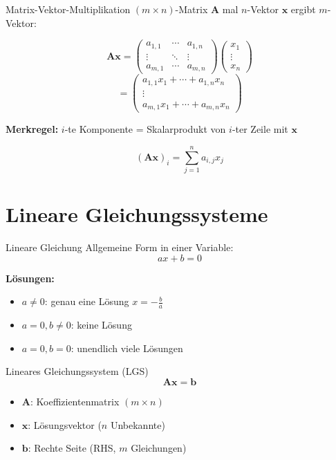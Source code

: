 \documentclass[a4paper, fontsize=7pt]{scrartcl}
\begin{document}
\begin{mainbox}{Matrix-Vektor-Multiplikation}
$(m \times n)$-Matrix $\mathbf{A}$ mal $n$-Vektor $\mathbf{x}$ ergibt $m$-Vektor:

\[\mathbf{A}\mathbf{x} = \begin{pmatrix}
a_{1,1} & \cdots & a_{1,n} \\
\vdots & \ddots & \vdots \\
a_{m,1} & \cdots & a_{m,n}
\end{pmatrix} \begin{pmatrix} x_1 \\ \vdots \\ x_n \end{pmatrix} \]
\[= \begin{pmatrix}
a_{1,1}x_1 + \cdots + a_{1,n}x_n \\
\vdots \\
a_{m,1}x_1 + \cdots + a_{m,n}x_n
\end{pmatrix}\]

\textbf{Merkregel:} $i$-te Komponente = Skalarprodukt von $i$-ter Zeile mit $\mathbf{x}$

$$(\mathbf{A}\mathbf{x})_i = \sum_{j=1}^{n} a_{i,j} x_j$$
\end{mainbox}

\section{Lineare Gleichungssysteme}

\begin{mainbox}{Lineare Gleichung}
Allgemeine Form in einer Variable:
$$ax + b = 0$$

\textbf{Lösungen:}
\begin{itemize}
    \item $a \neq 0$: genau eine Lösung $x = -\frac{b}{a}$
    \item $a = 0, b \neq 0$: keine Lösung
    \item $a = 0, b = 0$: unendlich viele Lösungen
\end{itemize}
\end{mainbox}

\begin{mainbox}{Lineares Gleichungssystem (LGS)}
$$\mathbf{A}\mathbf{x} = \mathbf{b}$$

\begin{itemize}
    \item $\mathbf{A}$: Koeffizientenmatrix $(m \times n)$
    \item $\mathbf{x}$: Lösungsvektor ($n$ Unbekannte)
    \item $\mathbf{b}$: Rechte Seite (RHS, $m$ Gleichungen)
\end{itemize}
\end{mainbox}
\end{document}
